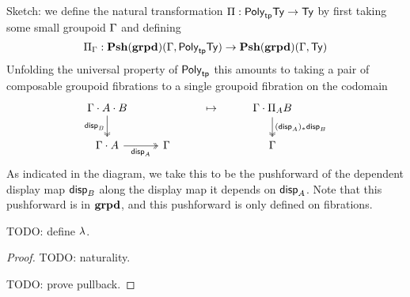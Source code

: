 \medskip

\begin{defn}
  Sketch: we define the natural transformation
  $\Pi : \textsf{Poly}_{\mathsf{tp}} \mathsf{Ty} \to \mathsf{Ty}$
  by first taking some small groupoid $\Gamma$ and defining
  \[\Pi_{\Gamma} : \mathbf{Psh}(\mathbf{grpd})(\Gamma, \textsf{Poly}_{\mathsf{tp}} \mathsf{Ty}) \to \mathbf{Psh}(\mathbf{grpd})(\Gamma, \mathsf{Ty})\]
  Unfolding the universal property of $\textsf{Poly}_{\mathsf{tp}}$
  this amounts to taking a pair of composable groupoid fibrations
  to a single groupoid fibration on the codomain
  \[\begin{tikzcd}
    {\Ga \cdot A \cdot B} && \mapsto & {\Ga \cdot \Pi_AB} \\
    {\Ga \cdot A} & \Ga && \Ga
    \arrow["{\disp{B}}"', two heads, from=1-1, to=2-1]
    \arrow["{(\disp{A})_* \disp{B}}", two heads, from=1-4, to=2-4]
    \arrow["{\disp{A}}"', two heads, from=2-1, to=2-2]
  \end{tikzcd}\]
  As indicated in the diagram, we take this to be the pushforward of the
  dependent display map $\mathsf{disp}_{B}$ along the display map it depends on $\mathsf{disp}_{A}$.
  Note that this pushforward is in $\mathbf{grpd}$,
  and this pushforward is only defined on fibrations.

  TODO: define $\lambda$.
\end{defn}
\begin{proof}
  TODO: naturality.

  TODO: prove pullback.
\end{proof}

\medskip

